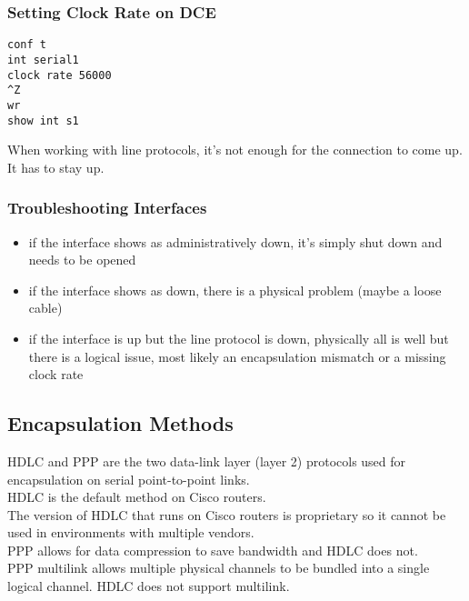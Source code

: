 \subsubsection{Setting Clock Rate on DCE}

\begin{verbatim}
conf t
int serial1
clock rate 56000
^Z
wr
show int s1
\end{verbatim}

When working with line protocols, it's not enough for the connection to
come up. It has to stay up.\\

\subsubsection{Troubleshooting Interfaces}

\begin{itemize}

\item if the interface shows as administratively down, it's simply shut
down and needs to be opened

\item if the interface shows as down, there is a physical problem (maybe
a loose cable)

\item if the interface is up but the line protocol is down, physically
all is well but there is a logical issue, most likely an encapsulation
mismatch or a missing clock rate

\end{itemize}

\subsection{Encapsulation Methods}

HDLC and PPP are the two data-link layer (layer 2) protocols used for
encapsulation on serial point-to-point links.\\

HDLC is the default method on Cisco routers.\\

The version of HDLC that runs on Cisco routers is proprietary so it cannot
be used in environments with multiple vendors.\\

PPP allows for data compression to save bandwidth and HDLC does not.\\

PPP multilink allows multiple physical channels to be bundled into a single
logical channel. HDLC does not support multilink.\\


